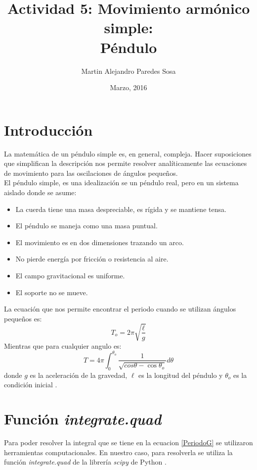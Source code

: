 \documentclass[12pt]{article}
\title{Actividad 5: Movimiento armónico simple:\\ Péndulo}
\author{Martin Alejandro Paredes Sosa}
\date{Marzo, 2016}
\begin{document}
\maketitle

\section{Introducción}
La matemática de un péndulo simple es, en general, compleja. Hacer suposiciones que simplifican la descripción nos permite resolver analíticamente las ecuaciones de movimiento para las oscilaciones de ángulos pequeños.\\
El péndulo simple, es una idealización se un péndulo real, pero en un sistema aislado donde se asume:
\begin{itemize}
	\item La cuerda tiene una masa despreciable, es rígida y se mantiene tensa.
	\item El péndulo se maneja como una masa puntual.
	\item El movimiento es en dos dimensiones trazando un arco.
	\item No pierde energía por fricción o resistencia al aire.
	\item El campo gravitacional es uniforme.
	\item El soporte no se mueve.
\end{itemize}

La ecuación que nos permite encontrar el periodo cuando se utilizan ángulos pequeños es:
\begin{equation}\label{PeriodoP}
	T_o = 2\pi\sqrt{\frac{\ell}{g}}
\end{equation}
Mientras que para cualquier angulo es:
\begin{equation}\label{PeriodoG}
	T = 4\pi \int^{\theta_o}_0 \frac{1}{\sqrt{cos\theta-\cos\theta_o}}d\theta
\end{equation}
donde $g$ es la aceleración de la gravedad, $\ell$ es la longitud del péndulo y $\theta_o$ es la condición inicial \cite{PendWiki}.

\section{Función \emph{integrate.quad}}
Para poder resolver la integral que se tiene en la ecuacion \eqref{PeriodoG} se utilizaron herramientas computacionales. En nuestro caso, para resolverla se utiliza la función \emph{integrate.quad} de la librería \emph{scipy} de Python \cite{scipy}.
\end{document}
